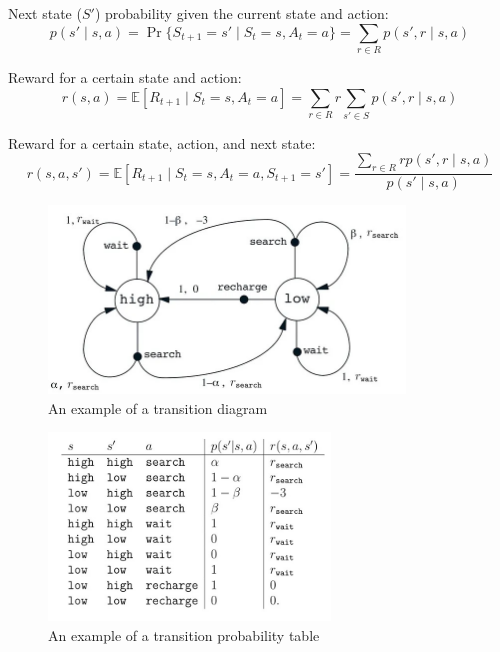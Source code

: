Next state ($S'$) probability given the current state and action:
\[
    p(s' \mid s, a) = \Pr\{S_{t+1} = s' \mid S_t = s, A_t = a\} = \sum_{r \in {R}} p(s', r \mid s, a)
\]

Reward for a certain state and action:
\[
    r(s, a) = \mathbb{E}[R_{t+1} \mid S_t = s, A_t = a] = \sum_{r \in {R}} r \sum_{s' \in {S}} p(s', r \mid s, a)
\]

Reward for a certain state, action, and next state:
\[
    r(s, a, s') = \mathbb{E}[R_{t+1} \mid S_t = s, A_t = a, S_{t+1} = s'] = \dfrac{\displaystyle\sum_{r \in {R}} r p(s', r \mid s, a)}{p(s' \mid s, a)}
\]

\begin{table}[H]
    \centering
    \begin{minipage}{0.35\linewidth}
        \begin{figure}[H]
            \includegraphics[height=5cm]{Pictures/deep-reinforcement-learning/eg1_mdp_fig.jpg}
            \caption{An example of a transition diagram}
        \end{figure}
    \end{minipage}
    \hfill
    \begin{minipage}{0.35\linewidth}
        \begin{figure}[H]
            \includegraphics[height=5cm]{Pictures/deep-reinforcement-learning/eg1_mdp_table.jpg}
            \caption{An example of a transition probability table}
        \end{figure}
    \end{minipage}
\end{table}

